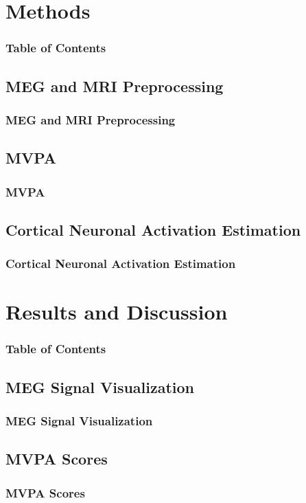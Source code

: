 \documentclass{beamer}
\begin{document}
\section{Methods}
\begin{frame}[plain]
    \frametitle{Table of Contents}
\end{frame}

\subsection{MEG and MRI Preprocessing}
\begin{frame}
    \frametitle{MEG and MRI Preprocessing}
\end{frame}

\subsection{MVPA}
\begin{frame}
    \frametitle{MVPA}
\end{frame}

\subsection{Cortical Neuronal Activation Estimation}
\begin{frame}
    \frametitle{Cortical Neuronal Activation Estimation}
\end{frame}

\section{Results and Discussion}
\begin{frame}[plain]
    \frametitle{Table of Contents}
\end{frame}

\subsection{MEG Signal Visualization}
\begin{frame}
    \frametitle{MEG Signal Visualization}
\end{frame}

\subsection{MVPA Scores}
\begin{frame}
    \frametitle{MVPA Scores}
\end{frame}
\end{document}
